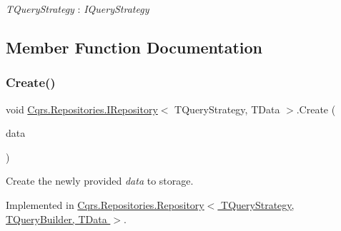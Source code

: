 \begin{Desc}
\item[Type Constraints]\begin{description}
\item[{\em T\+Query\+Strategy} : {\em I\+Query\+Strategy}]\end{description}
\end{Desc}


\subsection{Member Function Documentation}
\mbox{\label{interfaceCqrs_1_1Repositories_1_1IRepository_a240c8d094207a22b0c805a5c830d8615_a240c8d094207a22b0c805a5c830d8615}} 
\subsubsection{\texorpdfstring{Create()}{Create()}\hspace{0.1cm}{\footnotesize\ttfamily [1/2]}}
{\footnotesize\ttfamily void \hyperlink{interfaceCqrs_1_1Repositories_1_1IRepository}{Cqrs.\+Repositories.\+I\+Repository}$<$ T\+Query\+Strategy, T\+Data $>$.Create (\begin{DoxyParamCaption}\item[{T\+Data}]{data }\end{DoxyParamCaption})}



Create the newly provided {\itshape data}  to storage. 



Implemented in \hyperlink{classCqrs_1_1Repositories_1_1Repository_a5d5d78262533aa2ab32eddbab83869bd_a5d5d78262533aa2ab32eddbab83869bd}{Cqrs.\+Repositories.\+Repository$<$ T\+Query\+Strategy, T\+Query\+Builder, T\+Data $>$}.

\mbox{\label{interfaceCqrs_1_1Repositories_1_1IRepository_ae3481fb2ecb0146308e07a9dd6af8c14_ae3481fb2ecb0146308e07a9dd6af8c14}} 
